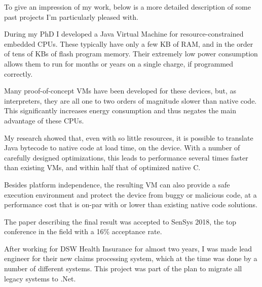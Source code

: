 \documentclass[10pt,a4paper]{../altacv}
\begin{document}









\newpage

\begin{fullwidth}

To give an impression of my work, below is a more detailed description of some past projects I’m particularly pleased with.

\bigskip


During my PhD I developed a Java Virtual Machine for resource-constrained embedded CPUs. These typically have only a few KB of RAM, and in the order of tens of KBs of flash program memory. Their extremely low power consumption allows them to run for months or years on a single charge, if programmed correctly.

\medskip\medskip

Many proof-of-concept VMs have been developed for these devices, but, as interpreters, they are all one to two orders of magnitude slower than native code. This significantly increases energy consumption and thus negates the main advantage of these CPUs.

\medskip\medskip

My research showed that, even with so little resources, it is possible to translate Java bytecode to native code at load time, on the device. With a number of carefully designed optimizations, this leads to performance several times faster than existing VMs, and within half that of optimized native C.

\medskip\medskip

Besides platform independence, the resulting VM can also provide a safe execution environment and protect the device from buggy or malicious code, at a performance cost that is on-par with or lower than existing native code solutions.

\medskip\medskip

The paper describing the final result was accepted to SenSys 2018, the top conference in the field with a 16\% acceptance rate.

\bigskip\bigskip

After working for DSW Health Insurance for almost two years, I was made lead engineer for their new claims processing system, which at the time was done by a number of different systems. This project was part of the plan to migrate all legacy systems to .Net.


\end{fullwidth}
\end{document}

